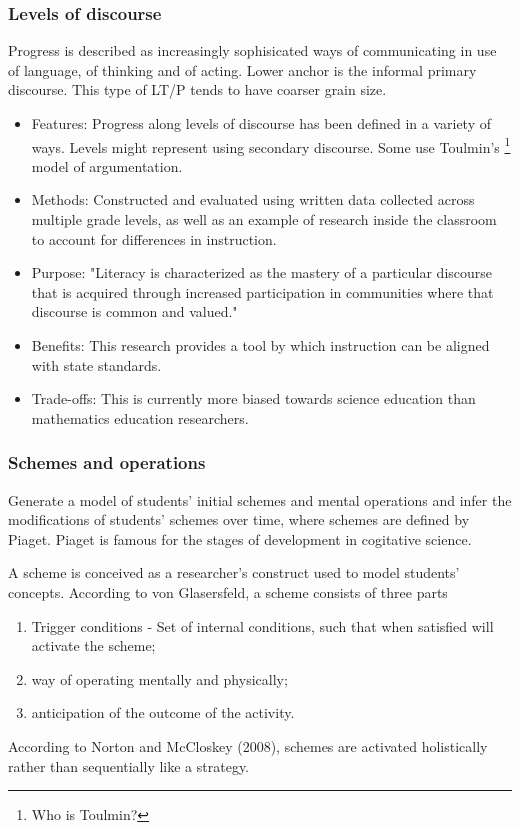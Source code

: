 \documentclass{TC}
\begin{document}
\subsubsection{Levels of discourse}

Progress is described as increasingly sophisicated ways of communicating in use of language, of thinking and of acting. Lower anchor is the informal primary discourse. This type of LT/P tends to have coarser grain size.

\begin{multicols}{2}
\begin{itemize} 
\item Features: Progress along levels of discourse has been defined in a variety of ways. Levels might represent using secondary discourse. Some use Toulmin's \footnote{Who is Toulmin?} model of argumentation.
\item Methods: Constructed and evaluated using written data collected across multiple grade levels, as well as an example of research inside the classroom to account for differences in instruction. 
\item Purpose: "Literacy is characterized as the mastery of a particular discourse that is acquired through increased participation in communities where that discourse is common and valued." 
\item Benefits: This research provides a tool by which instruction can be aligned with state standards. 
\item Trade-offs: This is currently more biased towards science education than mathematics education researchers. 
 \end{itemize}
 \end{multicols}
 
 
\subsubsection{Schemes and operations}

 Generate a model of students' initial schemes and mental operations and infer the modifications of students' schemes over time, where schemes are defined by Piaget. Piaget is famous for the stages of development in cogitative science.
\begin{mdframed}
\begin{definition}[Scheme]
A scheme is conceived as a researcher's construct used to model students' concepts.
According to von Glasersfeld, a scheme consists of three parts
\begin{enumerate}[(1)]
\item Trigger conditions - Set of internal conditions, such that when satisfied will activate the scheme;
\item way of operating mentally and physically;
\item anticipation of the outcome of the activity.
\end{enumerate}
According to Norton and McCloskey (2008), schemes are activated holistically rather than sequentially like a strategy. 
\end{definition}
\end{mdframed}
\end{document}
